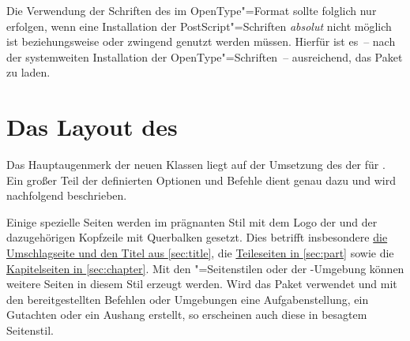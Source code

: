 Die Verwendung der Schriften des \CDs im OpenType"=Format sollte folglich nur 
erfolgen, wenn eine Installation der PostScript"=Schriften \emph{absolut} nicht 
möglich ist beziehungsweise  oder  zwingend 
genutzt werden müssen. Hierfür ist es~-- nach der systemweiten Installation der 
OpenType"=Schriften~-- ausreichend, das Paket  zu laden.
%



\section{Das Layout des \CDs}
Das Hauptaugenmerk der neuen Klassen liegt auf der Umsetzung des \CDs der
\TnUD für . Ein großer Teil der definierten Optionen und Befehle
dient genau dazu und wird nachfolgend beschrieben.

Einige spezielle Seiten werden im prägnanten Stil mit dem Logo der \TnUD und 
der dazugehörigen Kopfzeile mit Querbalken gesetzt. Dies betrifft insbesondere 
\hyperref[sec:title]{die Umschlagseite und den Titel aus \autoref{sec:title}}, 
die \hyperref[sec:part]{Teileseiten in \autoref{sec:part}} sowie die
\hyperref[sec:chapter]{Kapitelseiten in \autoref{sec:chapter}}. Mit den 
"=Seitenstilen oder der -Umgebung  
können weitere Seiten in diesem Stil erzeugt werden. Wird das Paket 
 verwendet und mit den bereitgestellten Befehlen oder 
Umgebungen eine Aufgabenstellung, ein Gutachten oder ein Aushang erstellt, so 
erscheinen auch diese in besagtem Seitenstil.


